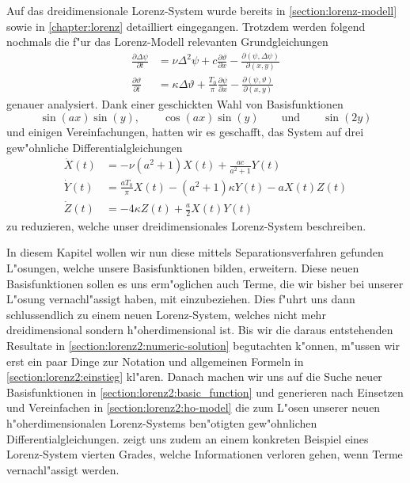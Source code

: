 Auf das dreidimensionale Lorenz-System wurde bereits in 
\cref{section:lorenz-modell} sowie in \cref{chapter:lorenz} detailliert 
eingegangen. Trotzdem werden folgend nochmals die f"ur das Lorenz-Modell 
%
relevanten Grundgleichungen
\begin{equation}
	\begin{aligned}
	\frac{\partial\Delta\psi}{\partial t}
	&=
	\nu\Delta^2\psi 
	+c\frac{\partial\vartheta}{\partial x}
	-\frac{\partial(\psi,\Delta\psi)}{\partial(x,y)}
	\\
	\frac{\partial\vartheta}{\partial t}
	&=
	\kappa\Delta\vartheta
	+ \frac{T_0}{\pi}\frac{\partial\psi}{\partial x}
	- \frac{\partial(\psi,\vartheta)}{\partial(x,y)}
	\end{aligned}
	\label{equation:lorenz2:base}
\end{equation}
genauer analysiert. Dank einer geschickten Wahl von Basisfunktionen
\begin{equation*}
	\sin(ax)\sin(y),
	\qquad
	\cos(ax)\sin(y)
	\qquad\text{und}\qquad
	\sin(2y)
\end{equation*}
und einigen Vereinfachungen, hatten wir es geschafft, das System auf drei 
gew"ohnliche Differential\-gleichungen
\begin{equation*}
	\begin{aligned}
	\dot X(t)
	&=
	-\nu(a^2+1)X(t)
	+\frac{ac}{a^2+1}Y(t)
	\\
	\dot Y(t)
	&=
	\frac{aT_0}{\pi}X(t)
	-(a^2+1)\kappa Y(t)
	-aX(t)Z(t)
	\\
	\dot Z(t)
	&=
	-4\kappa Z(t)
	+\frac{a}{2}X(t)Y(t)
	\end{aligned}
\end{equation*}
zu reduzieren, welche unser dreidimensionales Lorenz-System beschreiben.

In diesem Kapitel wollen wir nun diese mittels Separationsverfahren gefunden 
L"osungen, welche unsere Basisfunktionen bilden, erweitern. Diese neuen 
Basisfunktionen sollen es uns erm"oglichen auch Terme, die wir bisher bei 
unserer L"osung vernachl"assigt haben, mit einzubeziehen. Dies f"uhrt uns dann 
schlussendlich zu einem neuen Lorenz-System, welches nicht mehr 
dreidimensional sondern h"oherdimensional ist. Bis wir die daraus entstehenden 
Resultate in \cref{section:lorenz2:numeric-solution} begutachten k"onnen, 
m"ussen wir erst ein paar Dinge zur Notation und allgemeinen Formeln in 
\cref{section:lorenz2:einstieg} kl"aren. Danach machen wir uns auf die Suche 
neuer Basisfunktionen in \cref{section:lorenz2:basic_function} und generieren 
nach Einsetzen und Vereinfachen in \cref{section:lorenz2:ho-model} die zum 
L"osen unserer neuen h"oherdimensionalen Lorenz-Systems ben"otigten 
gew"ohnlichen Differentialgleichungen.  
zeigt uns zudem an einem konkreten Beispiel eines Lorenz-System vierten 
Grades, welche Informationen verloren gehen, wenn Terme vernachl"assigt werden.
